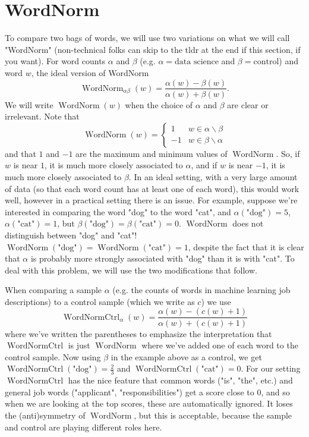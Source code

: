 \documentclass[12pt]{article}
\DeclareMathOperator{\WN}{WordNorm}
\DeclareMathOperator{\WNt}{WordNormCtrl}
\begin{document}
\section{WordNorm} To compare two bags of words, we will use two variations on what we will call "WordNorm" (non-technical folks can skip to the tldr at the end if this section, if you want). For word counts $\alpha$ and $\beta$ (e.g. $\alpha = \text{data science}$ and $\beta = \text{control}$) and word $w$, the ideal version of WordNorm
\begin{equation} \label{eqn:WordNorm}
 \WN_{\alpha\beta}(w) = \frac{\alpha(w)-\beta(w)}{\alpha(w)+\beta(w)}.
\end{equation}
We will write $\WN(w)$ when the choice of $\alpha$ and $\beta$ are clear or irrelevant. Note that 
\[
 \WN(w) = \begin{cases} 1 & w \in \alpha \smallsetminus \beta \\ -1 & w \in \beta \smallsetminus \alpha \end{cases}
\]
and that $1$ and $-1$ are the maximum and minimum values of $\WN$. So, if $w$ is near $1$, it is much more closely associated to $\alpha$, and if $w$ is near $-1$, it is much more closely associated to $\beta$. In an ideal setting, with a very large amount of data (so that each word count has at least one of each word), this would work well, however in a practical setting there is an issue. For example, suppose we're interested in comparing the word "dog" to the word "cat", and $\alpha(\text{"dog"}) = 5$, $\alpha(\text{"cat"}) = 1$, but $\beta(\text{"dog"})=\beta(\text{"cat"})=0$. $\WN$ does not distinguish between "dog" and "cat"! $\WN(\text{"dog"})=\WN(\text{"cat"}) = 1$, despite the fact that it is clear that $\alpha$ is probably more strongly associated with "dog" than it is with "cat". To deal with this problem, we will use the two modifications that follow.

When comparing a sample $\alpha$ (e.g. the counts of words in machine learning job descriptions) to a control sample (which we write as $c$) we use
\begin{equation} \label{eqn:WordNormCtrl}
 \WNt_\alpha(w) = \frac{\alpha(w) - (c(w)+1)}{\alpha(w) + (c(w) + 1)}
\end{equation}
where we've written the parentheses to emphasize the interpretation that $\WNt$ is just $\WN$ where we've added one of each word to the control sample. Now using $\beta$ in the example above as a control, we get $\WNt(\text{"dog"})=\frac{2}{3}$ and $\WNt(\text{"cat"})=0$. For our setting $\WNt$ has the nice feature that common words  ("is", "the", etc.) and general job words ("applicant", "responsibilities") get a score close to $0$, and so when we are looking at the top scores, these are automatically ignored. It loses the (anti)symmetry of $\WN$, but this is acceptable, because the sample and control are playing different roles here.
\end{document}
